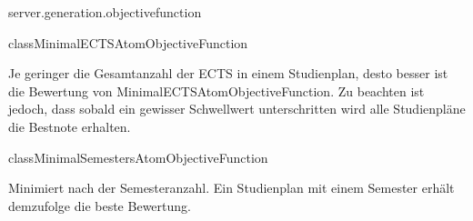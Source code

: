 \begin{texdocpackage}{server.generation.objectivefunction}
\begin{texdocclass}{class}{MinimalECTSAtomObjectiveFunction}
\label{texdoclet:edu.kit.informatik.studyplan.server.generation.objectivefunction.MinimalECTSAtomObjectiveFunction}
\begin{texdocclassintro}
Je geringer die Gesamtanzahl der ECTS in einem Studienplan, desto besser ist
 die Bewertung von MinimalECTSAtomObjectiveFunction. Zu beachten ist jedoch,
 dass sobald ein gewisser Schwellwert unterschritten wird alle Studienpläne
 die Bestnote erhalten.\end{texdocclassintro}
\begin{texdocclassconstructors}
\end{texdocclassconstructors}
\begin{texdocclassmethods}
\end{texdocclassmethods}
\end{texdocclass}


\begin{texdocclass}{class}{MinimalSemestersAtomObjectiveFunction}
\label{texdoclet:edu.kit.informatik.studyplan.server.generation.objectivefunction.MinimalSemestersAtomObjectiveFunction}
\begin{texdocclassintro}
Minimiert nach der Semesteranzahl. Ein Studienplan mit einem Semester erhält 
 demzufolge die beste Bewertung.\end{texdocclassintro}
\begin{texdocclassconstructors}
\end{texdocclassconstructors}
\begin{texdocclassmethods}
\end{texdocclassmethods}
\end{texdocclass}



\end{texdocpackage}
